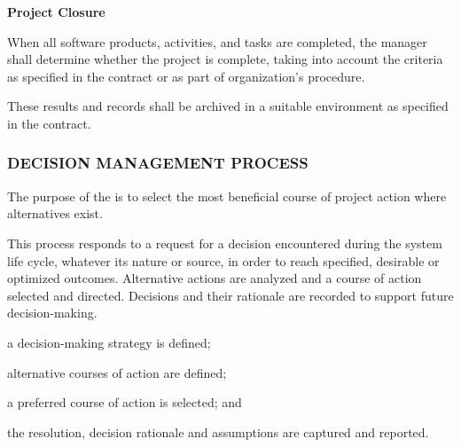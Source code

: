 \begin{adjustwidth}{2em}{0pt}
\begin{compactenum}
\begin{compactenum}
					\end{compactenum}


					\item {\bf Project Closure}

					\begin{compactenum}

						\item When all software products, activities, and tasks are completed, the manager shall determine whether the project is complete, taking into account the criteria as specified in the contract or as part of organization's procedure.

						\item These results and records shall be archived in a suitable environment as specified in the contract.

					\end{compactenum}

				\end{compactenum}

			\end{adjustwidth}

		\newpage
		\subsubsection{DECISION MANAGEMENT PROCESS\label{proc:decision_management_process}}

			\begin{adjustwidth}{2em}{0pt} 

				The purpose of the  is to select the most beneficial course of project action where alternatives exist.

				This process responds to a request for a decision encountered during the system life cycle, whatever its nature or source, in order to reach specified, desirable or optimized outcomes. Alternative actions are analyzed and a course of action selected and directed. Decisions and their rationale are recorded to support future decision-making.

			\end{adjustwidth}

			\begin{adjustwidth}{2em}{0pt} 

				\begin{compactitem}

					\item a decision-making strategy is defined;

					\item alternative courses of action are defined;

					\item a preferred course of action is selected; and

					\item the resolution, decision rationale and assumptions are captured and reported. 

				\end{compactitem}

			\end{adjustwidth}


